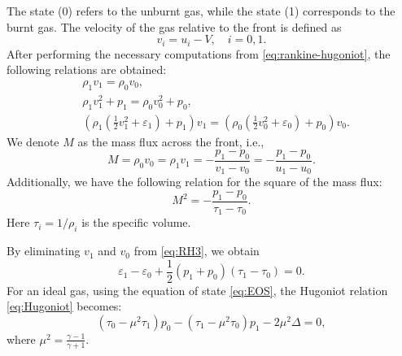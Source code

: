 The state (0) refers to the unburnt gas, while the state (1) corresponds to the burnt gas. The velocity of the gas relative to the front is defined as
\[
v_i = u_i - V, \quad i = 0,1.
\]
After performing the necessary computations from \eqref{eq:rankine-hugoniot}, the following relations are obtained:
\begin{eqnarray}
&\rho_1 v_1 = \rho_0 v_0, \label{eq:RH1} \\
&\rho_1 v_1^2 + p_1 = \rho_0 v_0^2 + p_0, \label{eq:RH2}\\
&\left(\rho_1 \left( \frac{1}{2} v_1^2 + \varepsilon_1 \right) + p_1 \right) v_1 =
\left(\rho_0 \left( \frac{1}{2} v_0^2 + \varepsilon_0 \right) + p_0 \right) v_0.\label{eq:RH3}
\end{eqnarray}
We denote $M$ as the mass flux across the front, i.e.,
\begin{equation}
M = \rho_0 v_0 = \rho_1 v_1 =  - \frac{p_1 - p_0}{v_1 - v_0} = - \frac{p_1-p_0}{u_1 - u_0}.
\label{eq:M}
\end{equation}
Additionally, we have the following relation for the square of the mass flux:
\begin{equation}
M^2 = - \frac{p_1-p_0}{\tau_1 - \tau_0}.
\label{eq:M2}
\end{equation}
Here $\tau_i = 1/\rho_i$ is the specific volume.

By eliminating $v_1$ and $v_0$ from \eqref{eq:RH3}, we obtain
\begin{equation}
\varepsilon_1 - \varepsilon_0 + \frac{1}{2}(p_1 + p_0)(\tau_1 - \tau_0) = 0.
\label{eq:Hugoniot}
\end{equation}
For an ideal gas, using the equation of state \eqref{eq:EOS}, the Hugoniot relation \eqref{eq:Hugoniot} becomes:
\begin{equation}
(\tau_0-\mu^2 \tau_1)p_0 - (\tau_1 - \mu^2 \tau_0)p_1 - 2\mu^2 \Delta = 0,
\label{eq:ideal_hugoniot}
\end{equation}
where $\mu^2 = \frac{\gamma-1}{\gamma+1}$.

